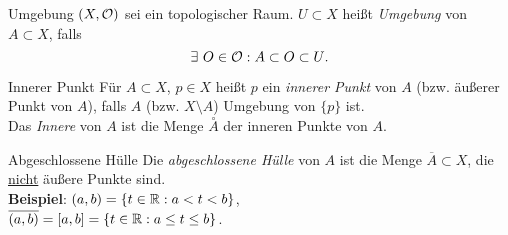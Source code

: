 \begin{definition}{Umgebung}
  $ (X, \mathcal{O}) $ sei ein topologischer Raum. $ U \subset X $ heißt \emph{Umgebung} von $ A \subset X $, falls
  \begin{equation*}
    \exists \ O \in \mathcal{O} : A \subset O \subset U\text{.}
  \end{equation*}
\end{definition}

\begin{definition}{Innerer Punkt}
  Für $ A \subset X $, $ p \in X $ heißt $ p $ ein \emph{innerer Punkt} von $ A $ (bzw. äußerer Punkt von $ A $), falls $ A $ (bzw. $ X \setminus A $) Umgebung von $ \{ p \} $ ist. \\
  Das \emph{Innere} von $ A $ ist die Menge $ \overset{\circ}{A} $ der inneren Punkte von $ A $.
\end{definition}

\begin{definition}{Abgeschlossene Hülle}
  Die \emph{abgeschlossene Hülle} von $ A $ ist die Menge $ \overline{A} \subset X $, die \underline{nicht} äußere Punkte sind. \\
  \textbf{Beispiel}: $ (a, b) = \{ t \in \mathbb{R} : a < t < b \} $, \\ $ \overline{(a,b)} = [a,b] = \{ t \in \mathbb{R} : a \leq t \leq b \} $.
\end{definition}

\clearpage

